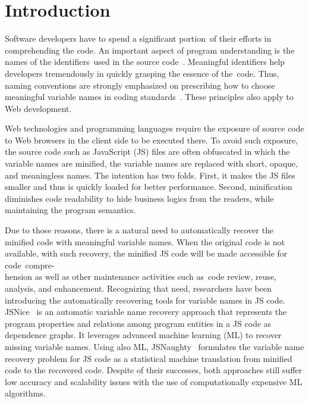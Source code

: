 \section{Introduction}
\label{intro:sec}

Software developers have to spend a
significant portion~of their efforts in comprehending the code. An
important aspect of program understanding
is the names of the identifiers~used in the source
code~\cite{sutton-fse15}. Meaningful identifiers help developers
tremendously in quickly grasping the essence of the~code. Thus,
naming conventions are strongly emphasized on prescribing how to
choose meaningful variable names in coding
standards~\cite{barr-codeconvention-fse14}.
These principles also apply to Web development.

Web technologies and programming languages require the exposure of
source code to Web browsers in the client side to be executed
there. To avoid such exposure, the source code such as JavaScript (JS)
files are often obfuscated in which the variable names are minified,
\ie the variable names are replaced with short, opaque, and
meaningless names. The intention has two folds. First, it makes the JS
files smaller and thus is quickly loaded for better performance.
Second, minification diminishes code readability to hide business
logics from the readers, while maintaining the program semantics.
%
%

Due to those reasons, there is a natural need to automatically recover
the minified code with meaningful variable names. When the original
code is not available, with such recovery, the minified JS code will
be made accessible for code~compre-\\hension as well as other maintenance
activities such as~code review, reuse, analysis, and
enhancement. Recognizing that need, researchers have been introducing
the automatically recovering tools for variable names in JS code.
%
JSNice~\cite{JSNice2015} is an automatic variable name recovery
approach that represents the program properties and relations among
program entities in a JS code as dependence graphs.
%
It leverages advanced machine learning (ML) to recover missing
variable names.
%
Using also ML, JSNaughty~\cite{JSNaughty2017}
formulates the variable name recovery problem for JS code as a
statistical machine translation from minified code to the
recovered code. Despite of their successes, both approaches still
suffer low accuracy and scalability issues with the use of
computationally expensive ML algorithms.

